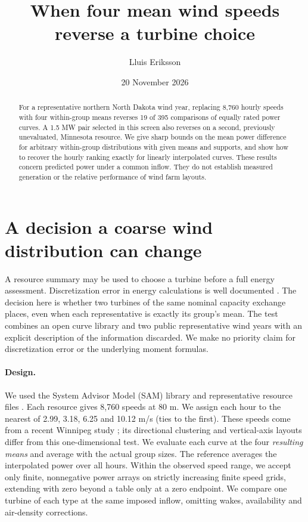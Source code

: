 \documentclass[11pt]{article}
\title{\vspace{-2em}When four mean wind speeds reverse a turbine choice}
\author{Lluis Eriksson}\date{20 November 2026}
\begin{document}
\maketitle
\begin{abstract}
For a representative northern North Dakota wind year, replacing 8,760 hourly speeds with four within-group means reverses 19 of 395 comparisons of equally rated power curves. A 1.5 MW pair selected in this screen also reverses on a second, previously unevaluated, Minnesota resource. We give sharp bounds on the mean power difference for arbitrary within-group distributions with given means and supports, and show how to recover the hourly ranking exactly for linearly interpolated curves. These results concern predicted power under a common inflow. They do not establish measured generation or the relative performance of wind farm layouts.
\end{abstract}
\section*{A decision a coarse wind distribution can change}
A resource summary may be used to choose a turbine before a full energy assessment. Discretization error in energy calculations is well documented \cite{processing,flowers}. The decision here is whether two turbines of the same nominal capacity exchange places, even when each representative is exactly its group's mean. The test combines an open curve library and two public representative wind years with an explicit description of the information discarded. We make no priority claim for discretization error or the underlying moment formulas.

\paragraph{Design.} We used the System Advisor Model (SAM) library and representative resource files \cite{sam}. Each resource gives 8,760 speeds at 80 m. We assign each hour to the nearest of 2.99, 3.18, 6.25 and 10.12 m/s (ties to the first). These speeds come from a recent Winnipeg study \cite{zaidi}; its directional clustering and vertical-axis layouts differ from this one-dimensional test. We evaluate each curve at the four \emph{resulting means} and average with the actual group sizes. The reference averages the interpolated power over all hours. Within the observed speed range, we accept only finite, nonnegative power arrays on strictly increasing finite speed grids, extending with zero beyond a table only at a zero endpoint. We compare one turbine of each type at the same imposed inflow, omitting wakes, availability and air-density corrections.
\end{document}
